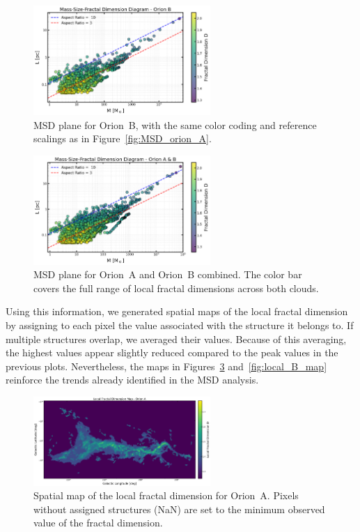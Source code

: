 \begin{figure}[t]
    \centering
    \includegraphics[width=0.6\textwidth]{figures/MSD_Orion_B.png}
    \caption{MSD plane for Orion~B, with the same color coding and reference scalings as in Figure~\ref{fig:MSD_orion_A}.}
    \label{fig:MSD_orion_B}
\end{figure}

\begin{figure}[t]
    \centering
    \includegraphics[width=0.6\textwidth]{figures/MSD_Orion_A_B.png}
    \caption{MSD plane for Orion~A and Orion~B combined. The color bar covers the full range of local fractal dimensions across both clouds.}
    \label{fig:MSD_orion_A_B}
\end{figure}

Using this information, we generated spatial maps of the local fractal dimension by assigning to each pixel the value associated with the structure it belongs to.  
If multiple structures overlap, we averaged their values.  
Because of this averaging, the highest values appear slightly reduced compared to the peak values in the previous plots.  
Nevertheless, the maps in Figures~\ref{fig:local_A_map} and~\ref{fig:local_B_map} reinforce the trends already identified in the MSD analysis.

\begin{figure}[t]
    \centering
    \includegraphics[width=0.6\textwidth]{figures/local_fractal_dimension_map_Orion_A.png}
    \caption{Spatial map of the local fractal dimension for Orion~A. Pixels without assigned structures (NaN) are set to the minimum observed value of the fractal dimension.}
    \label{fig:local_A_map}
\end{figure}

